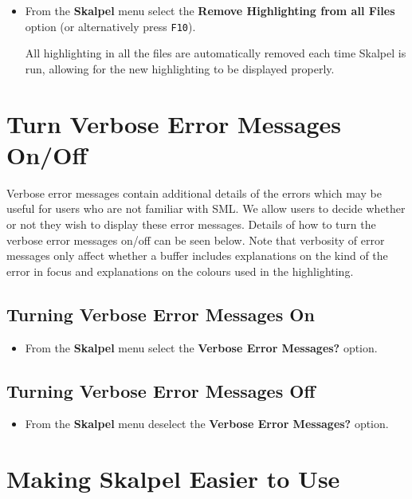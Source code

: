 \documentclass{report}
\begin{document}
\begin{itemize}
\item From the \textbf{Skalpel} menu select the \textbf{Remove
  Highlighting from all Files} option (or alternatively press
  \texttt{F10}).

  All highlighting in all the files are automatically removed each time
  Skalpel is run, allowing for the new highlighting to be displayed
  properly.

\end{itemize}

\section{Turn Verbose Error Messages On/Off}

Verbose error messages contain additional details of the errors which
may be useful for users who are not familiar with SML.  We allow users
to decide whether or not they wish to display these error messages.
Details of how to turn the verbose error messages on/off can be seen
below.  Note that verbosity of error messages only affect whether a
buffer includes explanations on the kind of the error in focus and
explanations on the colours used in the highlighting.

\subsection{Turning Verbose Error Messages On}

  \begin{itemize}
  \item From the \textbf{Skalpel}
    menu select the \textbf{Verbose Error Messages?} option.
  \end{itemize}

\subsection{Turning Verbose Error Messages Off}

  \begin{itemize}
  \item From the \textbf{Skalpel} menu
    deselect the \textbf{Verbose Error Messages?} option.
  \end{itemize}


\section{Making Skalpel Easier to Use}
\end{document}
